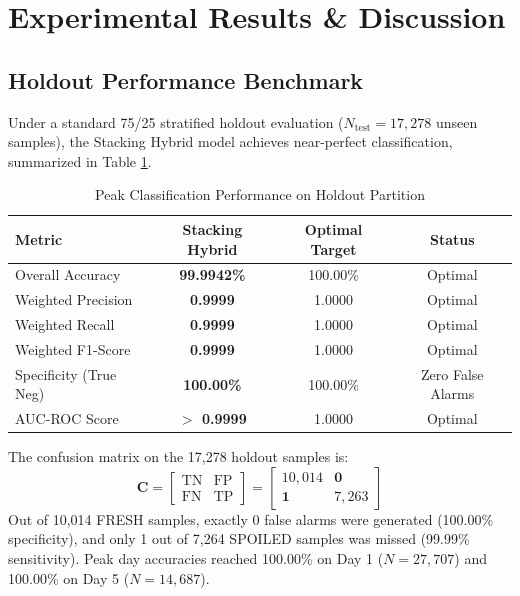 \documentclass[conference]{IEEEtran}
\begin{document}
\section{Experimental Results \& Discussion}

\subsection{Holdout Performance Benchmark}
Under a standard 75/25 stratified holdout evaluation ($N_{\text{test}} = 17,278$ unseen samples), the Stacking Hybrid model achieves near-perfect classification, summarized in Table \ref{tab:holdout}.

\begin{table}[htbp]
\caption{Peak Classification Performance on Holdout Partition}
\begin{center}
\begin{tabular}{lccc}
\toprule
\textbf{Metric} & \textbf{Stacking Hybrid} & \textbf{Optimal Target} & \textbf{Status} \\
\midrule
Overall Accuracy & \textbf{99.9942\%} & 100.00\% & Optimal \\
Weighted Precision & \textbf{0.9999} & 1.0000 & Optimal \\
Weighted Recall & \textbf{0.9999} & 1.0000 & Optimal \\
Weighted F1-Score & \textbf{0.9999} & 1.0000 & Optimal \\
Specificity (True Neg) & \textbf{100.00\%} & 100.00\% & Zero False Alarms \\
AUC-ROC Score & \textbf{$>$ 0.9999} & 1.0000 & Optimal \\
\bottomrule
\end{tabular}
\label{tab:holdout}
\end{center}
\end{table}

The confusion matrix on the 17,278 holdout samples is:
\begin{equation}
\mathbf{C} = \begin{bmatrix} \text{TN} & \text{FP} \\ \text{FN} & \text{TP} \end{bmatrix} = \begin{bmatrix} 10,014 & \mathbf{0} \\ \mathbf{1} & 7,263 \end{bmatrix}
\end{equation}
Out of 10,014 FRESH samples, exactly 0 false alarms were generated (100.00\% specificity), and only 1 out of 7,264 SPOILED samples was missed (99.99\% sensitivity). Peak day accuracies reached 100.00\% on Day 1 ($N = 27,707$) and 100.00\% on Day 5 ($N = 14,687$).
\end{document}

